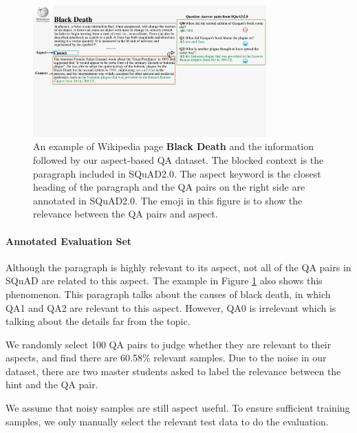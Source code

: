 \begin{figure}[th]
    \begin{center}
    \includegraphics[width=0.8\textwidth]{pic/Wikipedia.pdf}
        \caption{\label{fig:wiki} An example of Wikipedia page \textbf{Black Death} and the information followed by our aspect-based QA dataset.
        The blocked context is the paragraph included in SQuAD2.0. The aspect keyword is the closest heading of the paragraph and the QA pairs on the right side are annotated in SQuAD2.0. The emoji in this figure is to show the relevance between the QA pairs and  aspect.}
    \end{center}
\end{figure}

\paragraph{Annotated Evaluation Set}
Although the paragraph is highly relevant to its aspect, not all of the QA pairs in SQuAD are related to this aspect.
The example in Figure \ref{fig:wiki} also shows this phenomenon. 
This paragraph talks about the causes of black death, in which QA1 and QA2 are relevant to this aspect.
However, QA0 is irrelevant which is talking about the details far from the topic.

We randomly select 100 QA pairs to judge whether they are relevant to their aspects, and find there are 60.58\% relevant samples.
Due to the noise in our dataset, there are two master students asked to label the relevance between the hint and the QA pair.

We assume that noisy samples are still aspect useful.
To ensure sufficient training samples, we only manually select the relevant test data to do the evaluation.

